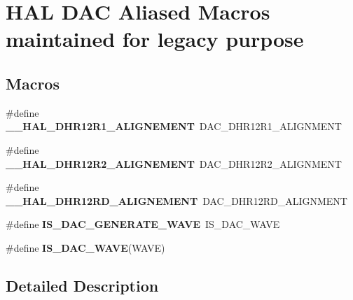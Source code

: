 \hypertarget{group___h_a_l___d_a_c___aliased___macros}{}\section{H\+AL D\+AC Aliased Macros maintained for legacy purpose}
\label{group___h_a_l___d_a_c___aliased___macros}
\subsection*{Macros}
\begin{DoxyCompactItemize}
\item 
\mbox{\label{group___h_a_l___d_a_c___aliased___macros_ga354fd3b8705eea7292d4e4169497da60}} 
\#define {\bfseries \+\_\+\+\_\+\+H\+A\+L\+\_\+\+D\+H\+R12\+R1\+\_\+\+A\+L\+I\+G\+N\+E\+M\+E\+NT}~D\+A\+C\+\_\+\+D\+H\+R12\+R1\+\_\+\+A\+L\+I\+G\+N\+M\+E\+NT
\item 
\mbox{\label{group___h_a_l___d_a_c___aliased___macros_ga2201f928be872705c094e047e49c4b82}} 
\#define {\bfseries \+\_\+\+\_\+\+H\+A\+L\+\_\+\+D\+H\+R12\+R2\+\_\+\+A\+L\+I\+G\+N\+E\+M\+E\+NT}~D\+A\+C\+\_\+\+D\+H\+R12\+R2\+\_\+\+A\+L\+I\+G\+N\+M\+E\+NT
\item 
\mbox{\label{group___h_a_l___d_a_c___aliased___macros_ga32958593af3de40d27a9944ab91a7255}} 
\#define {\bfseries \+\_\+\+\_\+\+H\+A\+L\+\_\+\+D\+H\+R12\+R\+D\+\_\+\+A\+L\+I\+G\+N\+E\+M\+E\+NT}~D\+A\+C\+\_\+\+D\+H\+R12\+R\+D\+\_\+\+A\+L\+I\+G\+N\+M\+E\+NT
\item 
\mbox{\label{group___h_a_l___d_a_c___aliased___macros_ga71522f902db10a227650387b90a0ae45}} 
\#define {\bfseries I\+S\+\_\+\+D\+A\+C\+\_\+\+G\+E\+N\+E\+R\+A\+T\+E\+\_\+\+W\+A\+VE}~I\+S\+\_\+\+D\+A\+C\+\_\+\+W\+A\+VE
\item 
\#define {\bfseries I\+S\+\_\+\+D\+A\+C\+\_\+\+W\+A\+VE}(W\+A\+VE)
\end{DoxyCompactItemize}


\subsection{Detailed Description}


